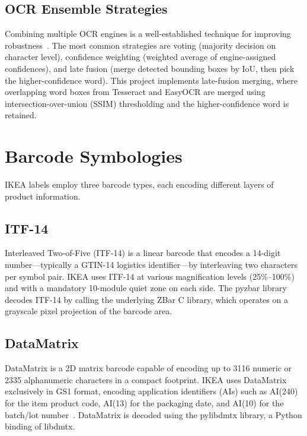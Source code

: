 \subsection{OCR Ensemble Strategies}

Combining multiple \ac{OCR} engines is a well-established technique for improving
robustness~\cite{ratzlaff2003method}. The most common strategies are voting (majority
decision on character level), confidence weighting (weighted average of engine-assigned
confidences), and late fusion (merge detected bounding boxes by IoU, then pick the
higher-confidence word). This project implements late-fusion merging, where overlapping
word boxes from Tesseract and EasyOCR are merged using intersection-over-union (\ac{SSIM})
thresholding and the higher-confidence word is retained.

\section{Barcode Symbologies}

IKEA labels employ three barcode types, each encoding different layers of product information.

\subsection{ITF-14}

Interleaved Two-of-Five (ITF-14) is a linear barcode that encodes a 14-digit number—typically
a GTIN-14 logistics identifier—by interleaving two characters per symbol pair. IKEA uses
ITF-14 at various magnification levels (25\%--100\%) and with a mandatory 10-module quiet
zone on each side. The pyzbar library decodes ITF-14 by calling the underlying ZBar C library,
which operates on a grayscale pixel projection of the barcode area.

\subsection{DataMatrix}

DataMatrix is a 2D matrix barcode capable of encoding up to 3116 numeric or 2335 alphanumeric
characters in a compact footprint. IKEA uses DataMatrix exclusively in GS1 format,
encoding application identifiers (AIs) such as AI(240) for the item product code, AI(13)
for the packaging date, and AI(10) for the batch/lot number~\cite{gs12023general}.
DataMatrix is decoded using the pylibdmtx library, a Python binding of libdmtx.

